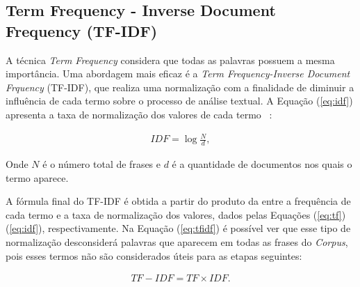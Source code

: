             \subsection{Term Frequency - Inverse Document Frequency (TF-IDF)}
            \label{sec:tfidf}

            A técnica \textit{Term Frequency} considera que todas as palavras possuem a mesma importância. Uma abordagem mais eficaz é a \textit{Term Frequency-Inverse Document Frquency} (TF-IDF), 
            que realiza uma normalização 
            com a finalidade de diminuir a influência de cada termo sobre o processo de análise textual. 
            A Equação (\ref{eq:idf}) apresenta a taxa de normalização dos valores de cada termo ~\cite{sparck1972statistical}:
               

               \begin{equation}\label{eq:idf}
                \begin{aligned}
                  IDF = \log \frac{N}{d},
              \end{aligned} 
              \end{equation}
               
              Onde $N$ é o número total de frases e $d$ é a quantidade de documentos nos quais o termo aparece.


              A fórmula final do TF-IDF é obtida a partir do produto da entre a frequência de cada termo e a taxa de normalização dos valores, dados pelas Equações (\ref{eq:tf}) (\ref{eq:idf}), respectivamente. Na Equação (\ref{eq:tfidf}) é possível ver que esse tipo de normalização desconsiderá
              palavras que aparecem em todas as frases do \textit{Corpus}, pois esses termos não são considerados úteis para as etapas seguintes:
              
              

              \begin{equation}\label{eq:tfidf}
                \begin{aligned}
                  TF-IDF = TF \times IDF.
              \end{aligned} 
              \end{equation}
               


